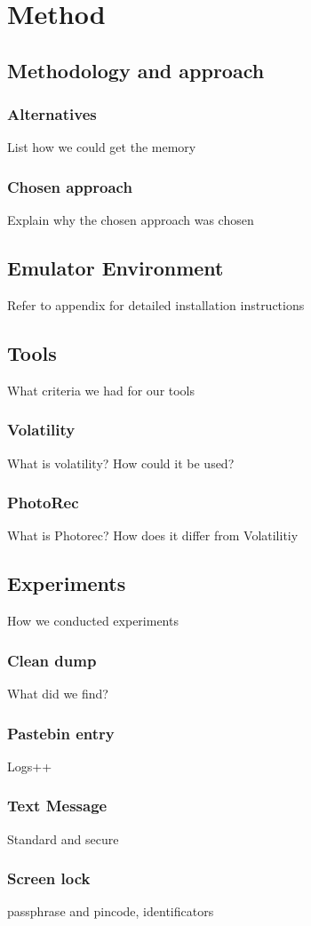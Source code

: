 \section{Method}
\subsection{Methodology and approach}
\subsubsection{Alternatives}
List how we could get the memory
\subsubsection{Chosen approach}
Explain why the chosen approach was chosen
\subsection{Emulator Environment}
Refer to appendix for detailed installation instructions
\subsection{Tools}
What criteria we had for our tools
\subsubsection{Volatility}
What is volatility? How could it be used?
\subsubsection{PhotoRec}
What is Photorec? How does it differ from Volatilitiy
\subsection{Experiments}
How we conducted experiments
\subsubsection{Clean dump}
What did we find?
\subsubsection{Pastebin entry}
Logs++
\subsubsection{Text Message}
Standard and secure
\subsubsection{Screen lock}
passphrase and pincode, identificators




